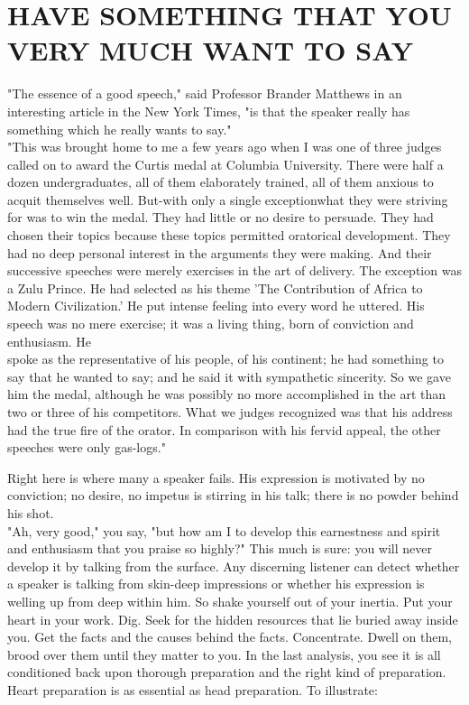 \documentclass[10pt]{article}
\begin{document}
\section*{HAVE SOMETHING THAT YOU VERY MUCH WANT TO SAY}
"The essence of a good speech," said Professor Brander Matthews in an interesting article in the New York Times, "is that the speaker really has something which he really wants to say."\\
"This was brought home to me a few years ago when I was one of three judges called on to award the Curtis medal at Columbia University. There were half a dozen undergraduates, all of them elaborately trained, all of them anxious to acquit themselves well. But-with only a single exceptionwhat they were striving for was to win the medal. They had little or no desire to persuade. They had chosen their topics because these topics permitted oratorical development. They had no deep personal interest in the arguments they were making. And their successive speeches were merely exercises in the art of delivery. The exception was a Zulu Prince. He had selected as his theme 'The Contribution of Africa to Modern Civilization.' He put intense feeling into every word he uttered. His speech was no mere exercise; it was a living thing, born of conviction and enthusiasm. He\\
spoke as the representative of his people, of his continent; he had something to say that he wanted to say; and he said it with sympathetic sincerity. So we gave him the medal, although he was possibly no more accomplished in the art than two or three of his competitors. What we judges recognized was that his address had the true fire of the orator. In comparison with his fervid appeal, the other speeches were only gas-logs."

Right here is where many a speaker fails. His expression is motivated by no conviction; no desire, no impetus is stirring in his talk; there is no powder behind his shot.\\
"Ah, very good," you say, "but how am I to develop this earnestness and spirit and enthusiasm that you praise so highly?" This much is sure: you will never develop it by talking from the surface. Any discerning listener can detect whether a speaker is talking from skin-deep impressions or whether his expression is welling up from deep within him. So shake yourself out of your inertia. Put your heart in your work. Dig. Seek for the hidden resources that lie buried away inside you. Get the facts and the causes behind the facts. Concentrate. Dwell on them, brood over them until they matter to you. In the last analysis, you see it is all conditioned back upon thorough preparation and the right kind of preparation. Heart preparation is as essential as head preparation. To illustrate:
\end{document}
